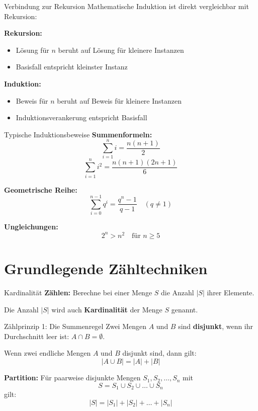 \documentclass[a4paper, fontsize=7pt]{scrartcl}
\begin{document}
\begin{subbox}{Verbindung zur Rekursion}
Mathematische Induktion ist direkt vergleichbar mit Rekursion:

\textbf{Rekursion:}
\begin{itemize}
    \item Lösung für $n$ beruht auf Lösung für kleinere Instanzen
    \item Basisfall entspricht kleinster Instanz
\end{itemize}

\textbf{Induktion:}
\begin{itemize}
    \item Beweis für $n$ beruht auf Beweis für kleinere Instanzen
    \item Induktionsverankerung entspricht Basisfall
\end{itemize}
\end{subbox}

\begin{mainbox}{Typische Induktionsbeweise}
\textbf{Summenformeln:}
$$\sum_{i=1}^{n} i = \frac{n(n+1)}{2}$$
$$\sum_{i=1}^{n} i^2 = \frac{n(n+1)(2n+1)}{6}$$

\textbf{Geometrische Reihe:}
$$\sum_{i=0}^{n-1} q^i = \frac{q^n - 1}{q - 1} \quad (q \neq 1)$$

\textbf{Ungleichungen:}
$$2^n > n^2 \quad \text{für } n \geq 5$$
\end{mainbox}

\section{Grundlegende Zähltechniken}

\begin{mainbox}{Kardinalität}
\textbf{Zählen:} Berechne bei einer Menge $S$ die Anzahl $|S|$ ihrer Elemente.

Die Anzahl $|S|$ wird auch \textbf{Kardinalität} der Menge $S$ genannt.
\end{mainbox}

\begin{mainbox}{Zählprinzip 1: Die Summenregel}
Zwei Mengen $A$ und $B$ sind \textbf{disjunkt}, wenn ihr Durchschnitt leer ist: $A \cap B = \emptyset$.

Wenn zwei endliche Mengen $A$ und $B$ disjunkt sind, dann gilt:
$$|A \cup B| = |A| + |B|$$

\textbf{Partition:} Für paarweise disjunkte Mengen $S_1, S_2, \ldots, S_n$ mit
$$S = S_1 \cup S_2 \cup \ldots \cup S_n$$
gilt:
$$|S| = |S_1| + |S_2| + \ldots + |S_n|$$
\end{mainbox}
\end{document}
